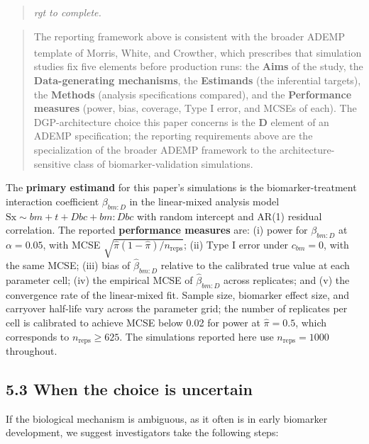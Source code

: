 \documentclass[
  11pt,
]{article}
\newenvironment{rgt}{%
  \begin{quote}\small\itshape\color[RGB]{20,60,160}}{%
  \end{quote}}
\newenvironment{orig}{%
  \begin{quote}\normalsize\color[gray]{0.55}}{%
  \end{quote}}
\begin{document}
\begin{rgt}
rgt to complete.

\end{rgt}

\begin{orig}
The reporting framework above is consistent with the broader ADEMP
template of Morris, White, and
Crowther\textsuperscript{}, which
prescribes that simulation studies fix five elements before production
runs: the \textbf{Aims} of the study, the
\textbf{Data-generating mechanisms}, the \textbf{Estimands} (the
inferential targets), the \textbf{Methods} (analysis specifications
compared), and the \textbf{Performance measures} (power, bias, coverage,
Type I error, and MCSEs of each). The DGP-architecture choice this paper
concerns is the \textbf{D} element of an ADEMP specification; the
reporting requirements above are the specialization of the broader ADEMP
framework to the architecture-sensitive class of biomarker-validation
simulations.

\end{orig}

The \textbf{primary estimand} for this paper's simulations is the
biomarker-treatment interaction coefficient \(\beta_{bm:D}\) in the
linear-mixed analysis model
\(\mathrm{Sx} \sim bm + t + Dbc + bm\!:\!Dbc\) with random intercept and
AR(1) residual correlation. The reported \textbf{performance measures}
are: (i) power for \(\beta_{bm:D}\) at \(\alpha = 0.05\), with MCSE
\(\sqrt{\hat{\pi}(1-\hat{\pi})/n_{\text{reps}}}\); (ii) Type I error
under \(c_{bm} = 0\), with the same MCSE; (iii) bias of
\(\hat{\beta}_{bm:D}\) relative to the calibrated true value at each
parameter cell; (iv) the empirical MCSE of \(\hat{\beta}_{bm:D}\) across
replicates; and (v) the convergence rate of the linear-mixed fit. Sample
size, biomarker effect size, and carryover half-life vary across the
parameter grid; the number of replicates per cell is calibrated to
achieve MCSE below 0.02 for power at \(\hat{\pi} = 0.5\), which
corresponds to \(n_{\text{reps}} \geq 625\). The simulations reported
here use \(n_{\text{reps}} = 1000\) throughout.

\subsection{5.3 When the choice is uncertain}

If the biological mechanism is ambiguous, as it often is in early
biomarker development, we suggest investigators take the following
steps:
\end{document}
